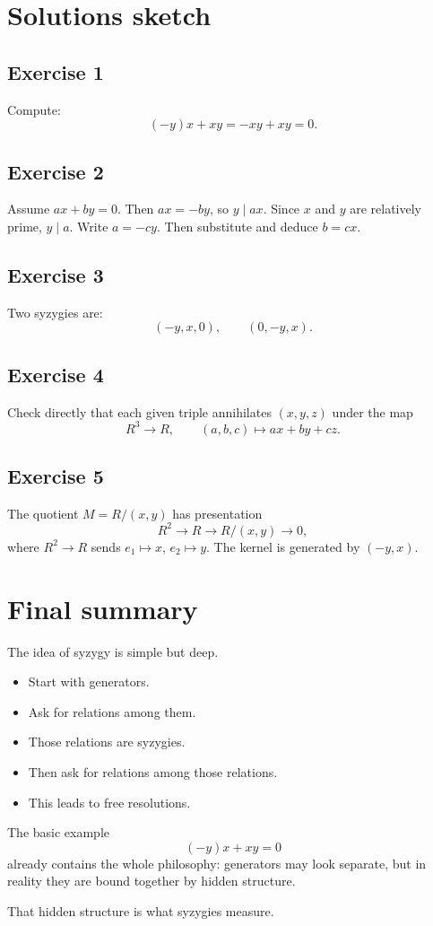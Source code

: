 \documentclass[11pt]{article}
\theoremstyle{definition}
\theoremstyle{remark}
\begin{document}
	\section{Solutions sketch}
	
	\subsection*{Exercise 1}
	Compute:
	\[
	(-y)x + x y = -xy + xy = 0.
	\]
	
	\subsection*{Exercise 2}
	Assume \(ax+by=0\). Then \(ax=-by\), so \(y\mid ax\). Since \(x\) and \(y\) are relatively prime, \(y\mid a\). Write \(a=-cy\). Then substitute and deduce \(b=cx\).
	
	\subsection*{Exercise 3}
	Two syzygies are:
	\[
	(-y,x,0),\qquad (0,-y,x).
	\]
	
	\subsection*{Exercise 4}
	Check directly that each given triple annihilates \((x,y,z)\) under the map
	\[
	R^3\to R,\qquad (a,b,c)\mapsto ax+by+cz.
	\]
	
	\subsection*{Exercise 5}
	The quotient \(M=R/(x,y)\) has presentation
	\[
	R^2 \to R \to R/(x,y)\to 0,
	\]
	where \(R^2\to R\) sends \(e_1\mapsto x\), \(e_2\mapsto y\). The kernel is generated by \((-y,x)\).
	
	\section{Final summary}
	
	The idea of syzygy is simple but deep.
	
	\begin{itemize}[leftmargin=2em]
		\item Start with generators.
		\item Ask for relations among them.
		\item Those relations are syzygies.
		\item Then ask for relations among those relations.
		\item This leads to free resolutions.
	\end{itemize}
	
	The basic example
	\[
	(-y)x + x y = 0
	\]
	already contains the whole philosophy: generators may look separate, but in reality they are bound together by hidden structure.
	
	That hidden structure is what syzygies measure.
	
\end{document}
